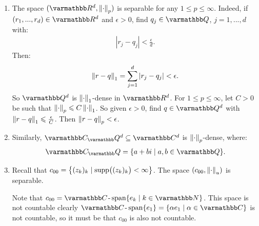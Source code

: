     \begin{example}
        \phantom{a}
        \begin{enumerate}[label = (\arabic*),itemsep=1pt,topsep=3pt]
            \item The space $(\bfR^d,\lnorm \cdot \rnorm_p)$ is separable for any $1 \leq p \leq \infty$. Indeed, if $(r_1,...,r_d) \in \bfR^d$ and $\epsilon > 0$, find $q_j \in \bfQ$, $j = 1,...,d$ with:
                \begin{equation*}
                \begin{split}
                    |r_j - q_j| < \frac{\epsilon}{d}.
                \end{split}
                \end{equation*}
            Then:
                \begin{equation*}
                \begin{split}
                    \left\lVert r-q \right\rVert_1 = \sum_{j = 1}^d |r_j - q_j| < \epsilon.
                \end{split}
                \end{equation*}
            So $\bfQ^d$ is $\left\lVert \cdot \right\rVert_1$-dense in $\bfR^d$. For $1 \leq p \leq \infty$, let $C>0$ be such that \newline $\left\lVert \cdot \right\rVert_p \leqslant C \left\lVert \cdot \right\rVert_1$. So given $\epsilon > 0$, find $q \in \bfQ^d$ with $\left\lVert r - q \right\rVert_1 \leqslant \frac{\epsilon}{C}$. Then $\left\lVert r - q \right\rVert_p < \epsilon$.

            \item Similarly, $\bfC_\bfQ^d \subseteq \bfC^d$ is $\left\lVert \cdot \right\rVert_p$-dense, where:
                \begin{equation*}
                \begin{split}
                    \bfC_\bfQ = \{a+bi \mid a,b \in \bfQ\}.
                \end{split}
                \end{equation*}

            \item Recall that $c_{00} = \left\{(z_k)_k \mid \operatorname{supp} \bigl((z_k)_k\bigr) < \infty \right\}$. The space $(c_{00},\left\lVert \cdot \right\rVert_u)$ is separable.
            
            Note that $c_{00} = \bfC\text{\h1-}\Span\{e_k \mid k \in \bfN\}$. This space is not countable \textemdash clearly $\bfC\text{\h1-}\Span\{e_1\} = \{\alpha e_1 \mid \alpha \in \bfC\}$ is not countable, so it must be that $c_{00}$ is also not countable.


\end{enumerate}
\end{example}
